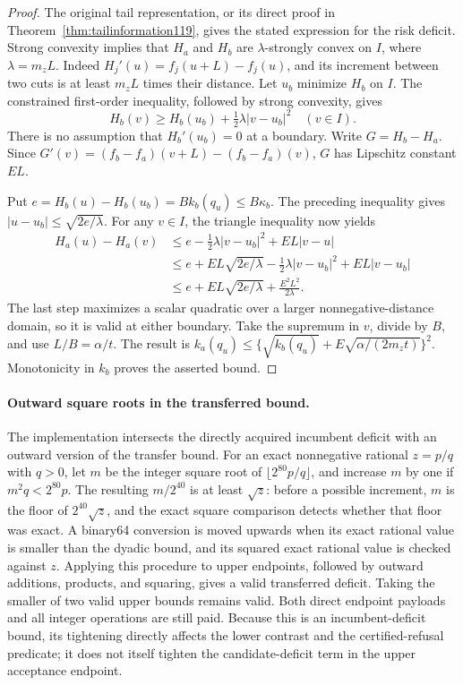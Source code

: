 \begin{proof}
The original tail representation, or its direct proof in
Theorem~\ref{thm:tailinformation119}, gives the stated expression
for the risk deficit.  Strong convexity implies that $H_a$
and $H_b$ are $\lambda$-strongly convex on $I$, where
$\lambda=m_zL$.  Indeed
$H_j'(u)=f_j(u+L)-f_j(u)$, and its increment between two
cuts is at least $m_zL$ times their distance.
Let $u_b$ minimize $H_b$ on $I$.  The constrained first-order
inequality, followed by strong convexity, gives
\[
 H_b(v)\ge H_b(u_b)+\tfrac12\lambda|v-u_b|^2
 \quad(v\in I).
\]
There is no assumption that $H_b'(u_b)=0$ at a boundary.
Write $G=H_b-H_a$.  Since
$G'(v)=(f_b-f_a)(v+L)-(f_b-f_a)(v)$,
$G$ has Lipschitz constant $EL$.

Put $e=H_b(u)-H_b(u_b)=Bk_b(q_u)\le B\kappa_b$.
The preceding inequality gives
$|u-u_b|\le\sqrt{2e/\lambda}$.
For any $v\in I$, the triangle inequality now yields
\begin{align*}
 H_a(u)-H_a(v)
 &\le e-\tfrac12\lambda|v-u_b|^2+EL|v-u|\\
 &\le e+EL\sqrt{2e/\lambda}
           -\tfrac12\lambda|v-u_b|^2+EL|v-u_b|\\
 &\le e+EL\sqrt{2e/\lambda}+\frac{E^2L^2}{2\lambda}.
\end{align*}
The last step maximizes a scalar quadratic over a larger
nonnegative-distance domain, so it is valid at either boundary.
Take the supremum in $v$, divide by $B$, and use
$L/B=\alpha/t$.  The result is
$k_a(q_u)\le\{\sqrt{k_b(q_u)}
          +E\sqrt{\alpha/(2m_zt)}\}^2$.
Monotonicity in $k_b$ proves the asserted bound.
\end{proof}

\paragraph{Outward square roots in the transferred bound.}
The implementation intersects the directly acquired incumbent
deficit with an outward version of the transfer bound.
For an exact nonnegative rational $z=p/q$ with $q>0$,
let $m$ be the integer square root of
$\lfloor 2^{80}p/q\rfloor$, and increase $m$ by one if
$m^2q<2^{80}p$.  The resulting $m/2^{40}$ is at least
$\sqrt z$: before a possible increment, $m$ is the
floor of $2^{40}\sqrt z$, and the exact square comparison
detects whether that floor was exact.  A binary64 conversion
is moved upwards when its exact rational value is smaller
than the dyadic bound, and its squared exact rational value
is checked against $z$.  Applying this procedure to upper
endpoints, followed by outward additions, products, and
squaring, gives a valid transferred deficit.
Taking the smaller of two valid upper bounds remains valid.
Both direct endpoint payloads and all integer operations are
still paid.  Because this is an incumbent-deficit bound,
its tightening directly affects the lower contrast and
the certified-refusal predicate; it does not itself tighten
the candidate-deficit term in the upper acceptance endpoint.

